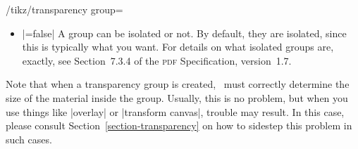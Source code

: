 \begin{key}{/tikz/transparency group=}
\begin{itemize}
        \item {}|=false| A group can be isolated or not. By
            default, they are isolated, since this is typically what you want.
            For details on what isolated groups are, exactly, see Section~7.3.4
            of the \textsc{pdf} Specification, version~1.7.
    \end{itemize}

    Note that when a transparency group is created, \tikzname\ must correctly
    determine the size of the material inside the group. Usually, this is no
    problem, but when you use things like |overlay| or |transform canvas|,
    trouble may result. In this case, please consult
    Section~\ref{section-transparency} on how to sidestep this problem in such
    cases.
\end{key}


